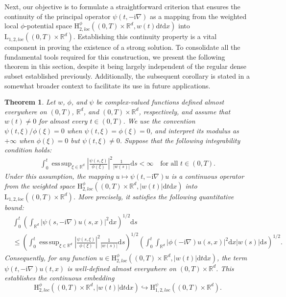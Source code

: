 \documentclass[11pt,reqno]{amsart}
\newtheorem{thm}{Theorem}[section]
\theoremstyle{definition}
\theoremstyle{remark}
\newcommand\bR{\mathbb{R}}
\DeclareMathOperator*{\esssup}{ess\,sup}
\numberwithin{equation}{section}
\begin{document}
Next, our objective is to formulate a straightforward criterion that ensures the continuity of the principal operator $\psi(t,-\mathrm{i}\nabla)$ as a mapping from the weighted local $\phi$-potential space $\mathrm{H}^\phi_{2,loc}\left((0,T)\times \bR^d , w(t) \mathrm{d}t\mathrm{d}x\right)$ into $\mathrm{L}_{1,2,loc}\left((0,T)\times \bR^d \right)$. 
Establishing this continuity property is a vital component in proving the existence of a strong solution. 
To consolidate all the fundamental tools required for this construction, we present the following theorem in this section, despite it being largely independent of the regular dense subset established previously. 
Additionally, the subsequent corollary is stated in a somewhat broader context to facilitate its use in future applications.

\begin{thm}
										\label{continuity operator}
Let $w$, $\phi$, and $\psi$ be complex-valued functions defined almost everywhere on $(0,T)$, $\bR^d$, and $(0,T) \times \bR^d$, respectively, and assume that $w(t)\ne 0$ for almost every $t\in(0,T)$. We use the convention $\psi(t,\xi)/\phi(\xi)=0$ when $\psi(t,\xi)=\phi(\xi)=0$, and interpret its modulus as $+\infty$ when $\phi(\xi)=0$ but $\psi(t,\xi)\ne0$. 
Suppose that the following integrability condition holds:
\begin{align}
										\label{20260406 10}
\int_0^t \esssup_{\xi \in \bR^d} \left| \frac{\psi(s,\xi)}{\phi(\xi)} \right|^2 \frac{1}{|w(s)|} \mathrm{d}s < \infty \quad \text{for all }t\in(0,T).
\end{align}
Under this assumption, the mapping $u \mapsto \psi(t,-\mathrm{i}\nabla)u$ is a continuous operator from the weighted space $\mathrm{H}^\phi_{2,loc}\left((0,T)\times \bR^d , |w(t)| \mathrm{d}t\mathrm{d}x\right)$ into $\mathrm{L}_{1,2,loc}\left((0,T)\times \bR^d \right)$. 
More precisely, it satisfies the following quantitative bound:
\begin{align*}
&\int_0^t \left( \int_{\bR^d} \left| \psi(s,-\mathrm{i}\nabla) u(s,x) \right|^2 \mathrm{d}x \right)^{1/2} \mathrm{d}s \\
&\leq \left(\int_0^t \esssup_{\xi \in \bR^d} \left| \frac{\psi(s,\xi)}{\phi(\xi)} \right|^2 \frac{1}{|w(s)|} \mathrm{d}s \right)^{1/2} \left( \int_0^t \int_{\bR^d} \left| \phi(-\mathrm{i}\nabla) u(s,x) \right|^2 \mathrm{d}x |w(s)| \mathrm{d}s \right)^{1/2}.
\end{align*}
Consequently, for any function $u \in \mathrm{H}^\phi_{2,loc}\left((0,T)\times \bR^d , |w(t)| \mathrm{d}t\mathrm{d}x\right)$, the term $\psi(t,-\mathrm{i}\nabla) u(t,x)$ is well-defined almost everywhere on $(0,T) \times \bR^d$. 
This establishes the continuous embedding
$$
\mathrm{H}^\phi_{2,loc}\left((0,T)\times \bR^d , |w(t)| \mathrm{d}t\mathrm{d}x\right) \hookrightarrow \mathrm{H}_{1,2,loc}^{\psi}\left( (0,T) \times \bR^d\right).
$$
\end{thm}
\end{document}
